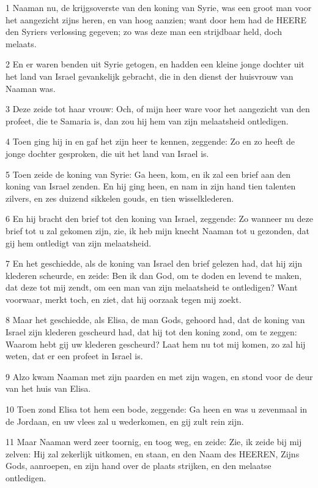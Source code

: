 \par 1 Naaman nu, de krijgsoverste van den koning van Syrie, was een groot man voor het aangezicht zijns heren, en van hoog aanzien; want door hem had de HEERE den Syriers verlossing gegeven; zo was deze man een strijdbaar held, doch melaats.
\par 2 En er waren benden uit Syrie getogen, en hadden een kleine jonge dochter uit het land van Israel gevankelijk gebracht, die in den dienst der huisvrouw van Naaman was.
\par 3 Deze zeide tot haar vrouw: Och, of mijn heer ware voor het aangezicht van den profeet, die te Samaria is, dan zou hij hem van zijn melaatsheid ontledigen.
\par 4 Toen ging hij in en gaf het zijn heer te kennen, zeggende: Zo en zo heeft de jonge dochter gesproken, die uit het land van Israel is.
\par 5 Toen zeide de koning van Syrie: Ga heen, kom, en ik zal een brief aan den koning van Israel zenden. En hij ging heen, en nam in zijn hand tien talenten zilvers, en zes duizend sikkelen gouds, en tien wisselklederen.
\par 6 En hij bracht den brief tot den koning van Israel, zeggende: Zo wanneer nu deze brief tot u zal gekomen zijn, zie, ik heb mijn knecht Naaman tot u gezonden, dat gij hem ontledigt van zijn melaatsheid.
\par 7 En het geschiedde, als de koning van Israel den brief gelezen had, dat hij zijn klederen scheurde, en zeide: Ben ik dan God, om te doden en levend te maken, dat deze tot mij zendt, om een man van zijn melaatsheid te ontledigen? Want voorwaar, merkt toch, en ziet, dat hij oorzaak tegen mij zoekt.
\par 8 Maar het geschiedde, als Elisa, de man Gods, gehoord had, dat de koning van Israel zijn klederen gescheurd had, dat hij tot den koning zond, om te zeggen: Waarom hebt gij uw klederen gescheurd? Laat hem nu tot mij komen, zo zal hij weten, dat er een profeet in Israel is.
\par 9 Alzo kwam Naaman met zijn paarden en met zijn wagen, en stond voor de deur van het huis van Elisa.
\par 10 Toen zond Elisa tot hem een bode, zeggende: Ga heen en was u zevenmaal in de Jordaan, en uw vlees zal u wederkomen, en gij zult rein zijn.
\par 11 Maar Naaman werd zeer toornig, en toog weg, en zeide: Zie, ik zeide bij mij zelven: Hij zal zekerlijk uitkomen, en staan, en den Naam des HEEREN, Zijns Gods, aanroepen, en zijn hand over de plaats strijken, en den melaatse ontledigen.
